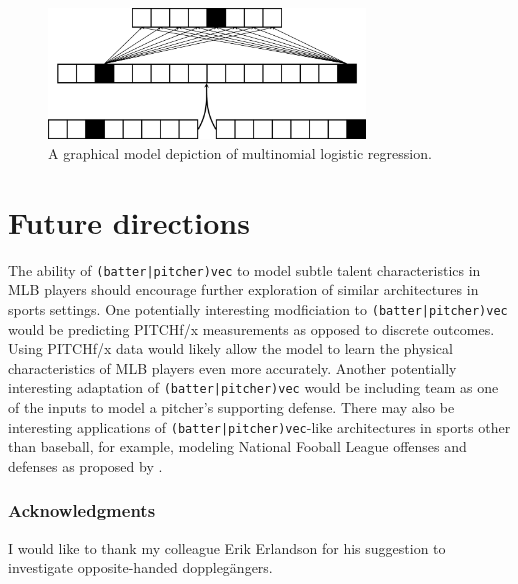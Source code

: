 \documentclass{article}
\begin{document}
\begin{figure}
\centering
\includegraphics[width=0.75\textwidth,height=\textheight,keepaspectratio]{logistic_regression.png}
\caption{A graphical model depiction of multinomial logistic regression.}
\label{fig:log_reg}
\end{figure}

\section{Future directions}
\label{future}

The ability of \texttt{(batter|pitcher)vec} to model subtle talent characteristics in MLB players should encourage further exploration of similar architectures in sports settings. One potentially interesting modficiation to \texttt{(batter|pitcher)vec} would be predicting PITCHf/x measurements as opposed to discrete outcomes. Using PITCHf/x data would likely allow the model to learn the physical characteristics of MLB players even more accurately. Another potentially interesting adaptation of \texttt{(batter|pitcher)vec} would be including team as one of the inputs to model a pitcher's supporting defense. There may also be interesting applications of \texttt{(batter|pitcher)vec}-like architectures in sports other than baseball, for example, modeling National Fooball League offenses and defenses as proposed by \parencite{Alcorn2016}.

\subsubsection*{Acknowledgments}

I would like to thank my colleague Erik Erlandson for his suggestion to investigate opposite-handed dopplegängers.

\printbibliography
\end{document}
